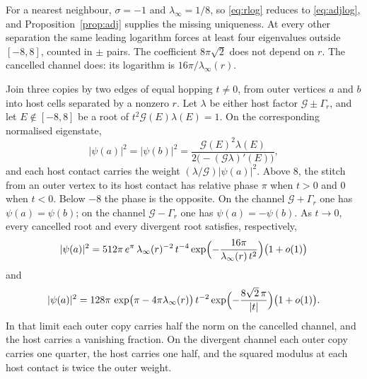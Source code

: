 For a nearest neighbour, \(\sigma=-1\) and \(\lambda_\infty=1/8\), so
\eqref{eq:rlog} reduces to \eqref{eq:adjlog}, and
Proposition~\ref{prop:adj} supplies the missing uniqueness.
At every other separation the same leading logarithm forces at least four
eigenvalues outside \([-8,8]\), counted in \(\pm\) pairs.
The coefficient \(8\pi\sqrt{2}\) does not depend on \(r\).
The cancelled channel does: its logarithm is \(16\pi/\lambda_\infty(r)\).

\begin{proposition}
\label{prop:twowt}
Join three copies by two edges of equal hopping \(t\neq 0\), from outer
vertices \(a\) and \(b\) into host cells separated by a nonzero \(r\).
Let \(\lambda\) be either host factor \(\mathcal{G}\pm\Gamma_r\), and let
\(E\notin[-8,8]\) be a root of \(t^2\mathcal{G}(E)\lambda(E)=1\).
On the corresponding normalised eigenstate,
\begin{equation}
\label{eq:twowt}
|\psi(a)|^2=|\psi(b)|^2
=\frac{\mathcal{G}(E)^2\lambda(E)}
{2\bigl(-(\mathcal{G}\lambda)'(E)\bigr)},
\end{equation}
and each host contact carries the weight \((\lambda/\mathcal{G})|\psi(a)|^2\).
Above \(8\), the stitch from an outer vertex to its host contact has
relative phase \(\pi\) when \(t>0\) and \(0\) when \(t<0\).
Below \(-8\) the phase is the opposite.
On the channel \(\mathcal{G}+\Gamma_r\) one has \(\psi(a)=\psi(b)\); on the
channel \(\mathcal{G}-\Gamma_r\) one has \(\psi(a)=-\psi(b)\).
As \(t\to 0\), every cancelled root and every divergent root satisfies,
respectively,
\begin{equation}
\label{eq:wcanc}
|\psi(a)|^2
=512\pi\, e^{\pi}\,
\lambda_\infty(r)^{-2}\, t^{-4}
\exp\Bigl(-\frac{16\pi}{\lambda_\infty(r)\, t^2}\Bigr)
\bigl(1+o(1)\bigr)
\end{equation}
and
\begin{equation}
\label{eq:wdiv}
|\psi(a)|^2
=128\pi\,
\exp\bigl(\pi-4\pi\lambda_\infty(r)\bigr)\,
t^{-2}
\exp\Bigl(-\frac{8\sqrt{2}\,\pi}{|t|}\Bigr)
\bigl(1+o(1)\bigr).
\end{equation}
In that limit each outer copy carries half the norm on the cancelled
channel, and the host carries a vanishing fraction.
On the divergent channel each outer copy carries one quarter, the host
carries one half, and the squared modulus at each host contact is twice
the outer weight.
\end{proposition}

